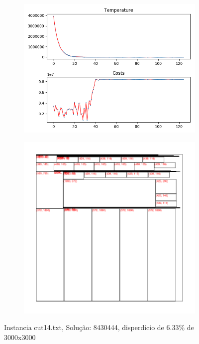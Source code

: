 \begin{figure}
\centering
\begin{subfigure}{.5\textwidth}
  \centering
  \includegraphics[width=1\linewidth]{results/cut14/1/plot}
  \label{fig:sub1}
\end{subfigure}%
\begin{subfigure}{.5\textwidth}
  \centering
  \includegraphics[width=1\linewidth]{results/cut14/1/cut}
  \label{fig:sub2}
\end{subfigure}
\caption{Instancia cut14.txt, Solução: 8430444, disperdício de 6.33\% de 3000x3000}
\label{fig:test}
\end{figure}


